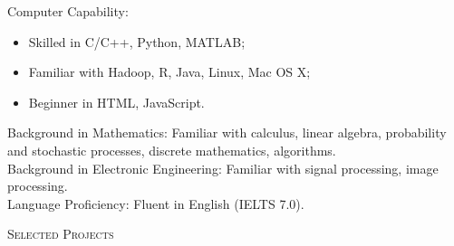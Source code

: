 \documentclass[9pt]{article}
\newenvironment{changemargin}[2]{%
  \begin{list}{}{%
    \setlength{\topsep}{0pt}%
    \setlength{\leftmargin}{#1}%
    \setlength{\rightmargin}{#2}%
    \setlength{\listparindent}{\parindent}%
    \setlength{\itemindent}{\parindent}%
    \setlength{\parsep}{\parskip}%
  }%
  \item[]}{\end{list}
}
\newcommand{\lineover}{
	\begin{changemargin}{-0.05in}{-0.05in}
		\vspace*{-8pt}
		\hrulefill \\
		\vspace*{-2pt}
	\end{changemargin}
}
\newcommand{\header}[1]{
	\begin{changemargin}{-0.5in}{-0.5in}
		\scshape{#1}\\
  	\lineover
	\end{changemargin}
}
\newenvironment{body} {
	\vspace*{-16pt}
	\begin{changemargin}{-0.25in}{-0.5in}
  }	
	{\end{changemargin}
}
\begin{document}
\begin{body}
	\vspace{14pt}
	Computer Capability: 
	\begin{itemize}
	\itemsep 0pt
	\item Skilled in C/C++, Python, MATLAB;
	\item Familiar with Hadoop, R, Java, Linux, Mac OS X;
	\item Beginner in HTML, JavaScript.
	\end{itemize}
	\smallskip
	Background in Mathematics: Familiar with calculus, linear algebra, probability and stochastic processes, discrete mathematics, algorithms.\\
	\smallskip
	Background in Electronic Engineering: Familiar with signal processing, image processing.\\
	Language Proficiency: Fluent in English (IELTS 7.0).\\
\end{body}
\smallskip
\smallskip

\header{Selected Projects}
\end{document}
